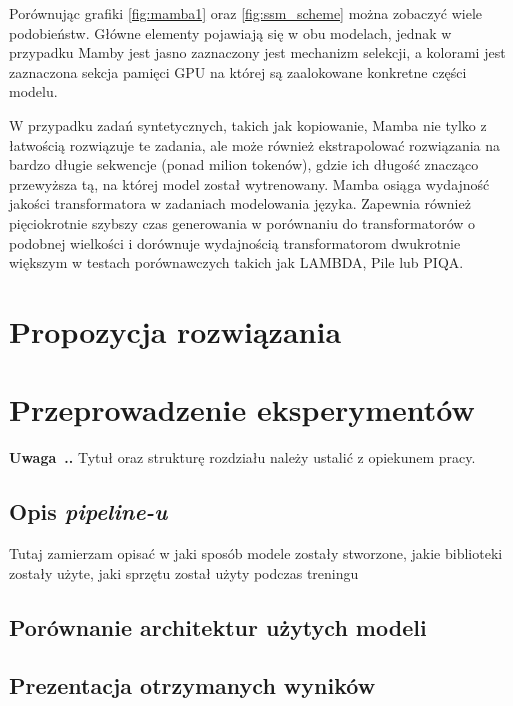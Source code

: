 \documentclass[data-science]{agh-wi} %
\newcounter{comment}[chapter]
\newenvironment{comment}[1][]{\begin{shaded}\refstepcounter{comment}
\noindent \textbf{Uwaga~\thechapter.\thecomment. #1} \rmfamily}{\end{shaded}}
\begin{document}
Porównując grafiki \ref*{fig:mamba1} oraz \ref*{fig:ssm_scheme} można zobaczyć wiele podobieństw. Główne elementy pojawiają się w obu modelach, jednak w przypadku Mamby jest jasno zaznaczony jest mechanizm selekcji, a kolorami jest zaznaczona sekcja pamięci GPU na której są zaalokowane konkretne części modelu.

W przypadku zadań syntetycznych, takich jak kopiowanie, Mamba nie tylko z łatwością rozwiązuje te zadania, ale może również ekstrapolować rozwiązania na bardzo długie sekwencje (ponad milion tokenów), gdzie ich długość znacząco przewyższa tą, na której model został wytrenowany. Mamba osiąga wydajność jakości transformatora w zadaniach modelowania języka. Zapewnia również pięciokrotnie szybszy czas generowania w porównaniu do transformatorów o podobnej wielkości i dorównuje wydajnością transformatorom dwukrotnie większym w testach porównawczych takich jak LAMBDA, Pile lub PIQA.


\chapter{Propozycja rozwiązania}
\chapter{Przeprowadzenie eksperymentów}
\begin{comment}
Tytuł oraz strukturę rozdziału należy ustalić z opiekunem pracy.
\end{comment}
\section{Opis \textit{pipeline-u}}
Tutaj zamierzam opisać w jaki sposób modele zostały stworzone, jakie biblioteki zostały użyte, jaki sprzętu został użyty podczas treningu
\section{Porównanie architektur użytych modeli}
\section{Prezentacja otrzymanych wyników}
\end{document}
